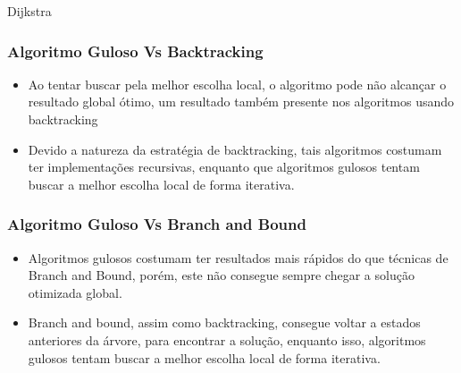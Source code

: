     \begin{algorithm}
        \caption{Dijkstra} 
        \begin{algorithmic}[1]
        \EndFor
        \EndFor
        \EndFor
        \EndProcedure
        \end{algorithmic}
    \end{algorithm}

    \subsubsection{Algoritmo Guloso Vs Backtracking}

    \begin{itemize}
        \item Ao tentar buscar pela melhor escolha local, o algoritmo pode não alcançar 
        o resultado global ótimo, um resultado também presente nos algoritmos usando backtracking
        \item Devido a natureza da estratégia de backtracking, tais algoritmos costumam ter 
        implementações recursivas, enquanto que algoritmos gulosos tentam 
        buscar a melhor escolha local de forma iterativa.
    \end{itemize}

    \subsubsection{Algoritmo Guloso Vs Branch and Bound}

    \begin{itemize}
        \item Algoritmos gulosos costumam ter resultados mais rápidos do que técnicas de 
        Branch and Bound, porém, este não consegue sempre chegar a solução otimizada global.
        \item Branch and bound, assim como backtracking, consegue voltar a estados anteriores 
        da árvore, para encontrar a solução, enquanto isso, algoritmos gulosos tentam 
        buscar a melhor escolha local de forma iterativa.
    \end{itemize}

    \nocite{greedy-algorithm}

\newpage